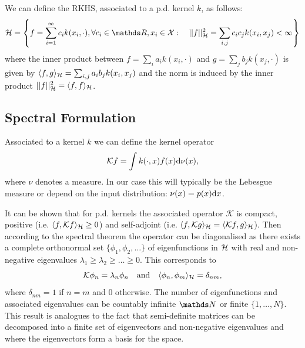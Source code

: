 We can define the RKHS, associated to a p.d. kernel $k$, as follows:
\begin{equation}
  \rkhs = \left\{f = \sum_{i=1}^\infty c_i k(x_i, \cdot), \forall c_i \in \Reals, x_i \in \mathcal{X}:\quad \norm{f}_{\rkhs}^2 = \sum_{i,j} c_i c_j k(x_i, x_j) < \infty \right\}
\end{equation}
where the inner product between $f = \sum_i a_i k(x_i, \cdot)$ and $g = \sum_j b_j k(x_j, \cdot)$ is given by $\langle f,g \rangle_{{\mathcal{H}}} = \sum_{i,j} a_i b_j k(x_i, x_j)$ and the norm is induced by the inner product $\lvert\lvert f\rvert\rvert^2_{{\mathcal{H}}} = \langle f, f \rangle_{{\mathcal{H}}}$.


\subsection{Spectral Formulation}
\label{section:theory:spectral-formulation}
\begin{definition}
Associated to a kernel $k$ we can define the kernel operator
\begin{equation}
  \mathcal{K} f = \int k(\cdot, x) f(x) \mathrm{d}{\nu(x)},
\end{equation}
where $\nu$ denotes a measure. In our case this will typically be the Lebesgue measure or depend on the input distribution: $\nu(x) = p(x)\mathrm{d}{x}$.
\end{definition}

It can be shown that for p.d. kernels the associated operator $\mathcal{K}$ is compact, positive (i.e. $\langle f, \mathcal{K} f\rangle_{{\mathcal{H}}} \ge 0$) and self-adjoint (i.e. $\langle f, \mathcal{K} g\rangle_{{\mathcal{H}}} = \langle \mathcal{K} f, g\rangle_{{\mathcal{H}}}$). Then according to the spectral theorem \citep[e.g.,][Chapter 17]{lang1993} the operator can be diagonalised as there exists a complete orthonormal set $\{\phi_1, \phi_2, \ldots \}$ of eigenfunctions in ${\mathcal{H}}$ with real and non-negative eigenvalues $\lambda_1 \ge \lambda_2 \ge \ldots \ge 0$. This corresponds to
\begin{equation}
  \mathcal{K} \phi_n = \lambda_n \phi_n\quad\text{and}\quad \langle \phi_n, \phi_m \rangle_{{\mathcal{H}}} = \delta_{nm},
\end{equation}
where $\delta_{nm} = 1$ if $n=m$ and $0$ otherwise. The number of eigenfunctions and associated eigenvalues can be countably infinite $\Naturals$ or finite $\{1, \ldots, N\}$. This result is analogues to the fact that semi-definite matrices can be decomposed into a finite set of eigenvectors and non-negative eigenvalues and where the eigenvectors form a basis for the space.

